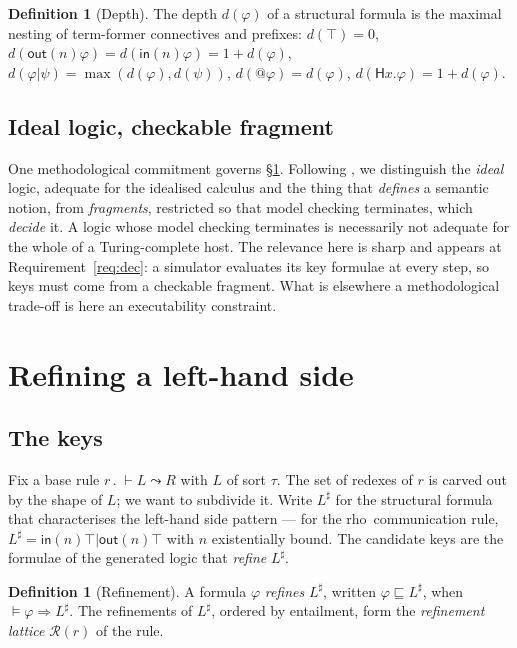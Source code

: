 \documentclass[11pt,a4paper]{article}
\theoremstyle{plain}
\theoremstyle{definition}
\newtheorem{definition}[theorem]{Definition}
\theoremstyle{remark}
\newcommand{\rhoc}{\textsf{rho}}
\newcommand{\sepc}{\mathbin{\big|}}
\newcommand{\Hq}{\mathsf{H}}
\newcommand{\out}{\mathsf{out}}
\newcommand{\inn}{\mathsf{in}}
\newcommand{\dpt}{d}
\begin{document}
\begin{definition}[Depth]
\label{def:depth}
The depth $\dpt(\varphi)$ of a structural formula is the maximal nesting of term-former connectives
and prefixes: $\dpt(\top) = 0$, $\dpt(\out(n)\varphi) = \dpt(\inn(n)\varphi) = 1 + \dpt(\varphi)$,
$\dpt(\varphi \sepc \psi) = \max(\dpt(\varphi), \dpt(\psi))$, $\dpt(@\varphi) = \dpt(\varphi)$,
$\dpt(\Hq x.\varphi) = 1 + \dpt(\varphi)$.
\end{definition}

\subsection{Ideal logic, checkable fragment}

One methodological commitment governs \S\ref{sec:refinement}. Following \cite[\S1.3]{classifier}, we
distinguish the \emph{ideal} logic, adequate for the idealised calculus and the thing that
\emph{defines} a semantic notion, from \emph{fragments}, restricted so that model checking
terminates, which \emph{decide} it. A logic whose model checking terminates is necessarily not
adequate for the whole of a Turing-complete host. The relevance here is sharp and appears at
Requirement~\ref{req:dec}: a simulator evaluates its key formulae at every step, so keys must come
from a checkable fragment. What is elsewhere a methodological trade-off is here an executability
constraint.

\section{Refining a left-hand side}
\label{sec:refinement}

\subsection{The keys}

Fix a base rule $r \,.\; \vdash L \leadsto R$ with $L$ of sort $\tau$. The set of redexes of $r$ is
carved out by the shape of $L$; we want to subdivide it. Write $L^\sharp$ for the structural formula
that characterises the left-hand side pattern --- for the \rhoc\ communication rule,
$L^\sharp = \inn(n)\top \sepc \out(n)\top$ with $n$ existentially bound. The candidate keys are the
formulae of the generated logic that \emph{refine} $L^\sharp$.

\begin{definition}[Refinement]
\label{def:refinement}
A formula $\varphi$ \emph{refines} $L^\sharp$, written $\varphi \sqsubseteq L^\sharp$, when
$\models \varphi \Rightarrow L^\sharp$. The refinements of $L^\sharp$, ordered by entailment, form
the \emph{refinement lattice} $\mathcal{R}(r)$ of the rule.
\end{definition}
\end{document}
